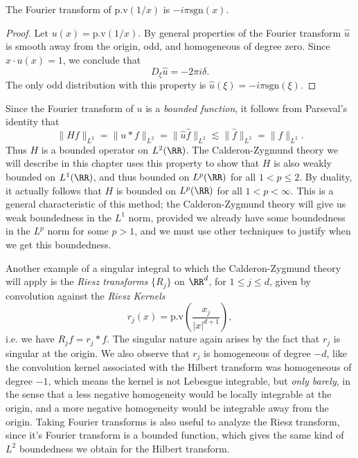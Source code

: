 \begin{lemma}
    The Fourier transform of $\text{p.v}(1/x)$ is $- i \pi \text{sgn}(x)$.
\end{lemma}
\begin{proof}
    Let $u(x) = \text{p.v}(1/x)$. By general properties of the Fourier transform $\widehat{u}$ is smooth away from the origin, odd, and homogeneous of degree zero. Since $x \cdot u(x) = 1$, we conclude that
    \[ D_\xi \widehat{u} = - 2 \pi i \delta. \]
    The only odd distribution with this property is $\widehat{u}(\xi) = - i \pi \text{sgn}(\xi)$.
\end{proof}

Since the Fourier transform of $u$ is a \emph{bounded function}, it follows from Parseval's identity that
%
\[ \| H f \|_{L^2} = \| u * f \|_{L^2} = \| \widehat{u} \widehat{f} \|_{L^2} \lesssim \| \widehat{f} \|_{L^2} = \| f \|_{L^2}. \]
%
Thus $H$ is a bounded operator on $L^2(\RR)$. The Calderon-Zygmund theory we will describe in this chapter uses this property to show that $H$ is also weakly bounded on $L^1(\RR)$, and thus bounded on $L^p(\RR)$ for all $1 < p \leq 2$. By duality, it actually follows that $H$ is bounded on $L^p(\RR)$ for all $1 < p < \infty$. This is a general characteristic of this method; the Calderon-Zygmund theory will give us weak boundedness in the $L^1$ norm, provided we already have some boundedness in the $L^p$ norm for some $p > 1$, and we must use other techniques to justify when we get this boundedness.

Another example of a singular integral to which the Calderon-Zygmund theory will apply is the \emph{Riesz transforms} $\{ R_j \}$ on $\RR^d$, for $1 \leq j \leq d$, given by convolution against the \emph{Riesz Kernels}
%
\[ r_j(x) = \text{p.v} \left( \frac{x_j}{|x|^{d+1}} \right), \]
%
i.e. we have $R_j f = r_j * f$. The singular nature again arises by the fact that $r_j$ is singular at the origin. We also observe that $r_j$ is homogeneous of degree $-d$, like the convolution kernel associated with the Hilbert transform was homogeneous of degree $-1$, which means the kernel is not Lebesgue integrable, but \emph{only barely}, in the sense that a less negative homogeneity would be locally integrable at the origin, and a more negative homogeneity would be integrable away from the origin. Taking Fourier transforms is also useful to analyze the Riesz transform, since it's Fourier transform is a bounded function, which gives the same kind of $L^2$ boundedness we obtain for the Hilbert transform.


